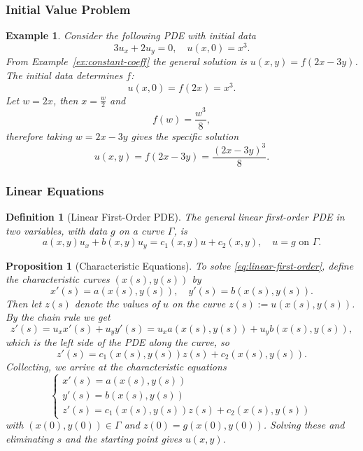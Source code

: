 \documentclass{article}
\newtheorem{definition}{Definition}
\newtheorem*{example}{Example}
\newtheorem{proposition}{Proposition}
\begin{document}
\subsubsection{Initial Value Problem}
\begin{example}
    Consider the following PDE with initial data
    \[3u_x+2u_y = 0, \quad u(x,0) = x^3.\]
    From Example~\ref{ex:constant-coeff} the general solution is $u(x,y) = f(2x-3y)$. The initial data determines $f$:
    \[u(x,0) = f(2x) = x^3.\]
    Let $w = 2x$, then $x=\frac{w}{2}$ and
    \[f(w) = \frac{w^3}{8},\]
    therefore taking $w=2x-3y$ gives the specific solution
    \[u(x,y) = f(2x-3y) = \frac{(2x-3y)^3}{8}.\]
\end{example}

\subsubsection{Linear Equations}
\begin{definition}[Linear First-Order PDE]
    The general linear first-order PDE in two variables, with data $g$ on a curve $\Gamma$, is
    \begin{equation}
        \label{eq:linear-first-order}
        a(x,y)u_x+b(x,y)u_y = c_1(x,y)u + c_2(x,y),\quad u = g \text{ on } \Gamma.
    \end{equation}
\end{definition}
\begin{proposition}[Characteristic Equations]
    \label{prop:characteristic-eqs}
    To solve \eqref{eq:linear-first-order}, define the characteristic curves $(x(s),y(s))$ by
    \[x'(s) = a(x(s),y(s)),\quad y'(s) = b(x(s),y(s)).\]
    Then let $z(s)$ denote the values of $u$ on the curve $z(s) := u(x(s),y(s))$. By the chain rule we get
    \[z'(s) = u_xx'(s) + u_yy'(s) = u_xa(x(s),y(s))+u_yb(x(s),y(s)),\]
    which is the left side of the PDE along the curve, so
    \[z'(s) = c_1(x(s),y(s))z(s)+c_2(x(s),y(s)).\]
    Collecting, we arrive at the characteristic equations
    \[\begin{cases}x'(s)=a(x(s),y(s))\\y'(s)=b(x(s),y(s))\\z'(s)=c_1(x(s),y(s))z(s)+c_2(x(s),y(s))\end{cases}\]
    with $(x(0),y(0))\in\Gamma$ and $z(0)=g(x(0),y(0))$. Solving these and eliminating $s$ and the starting point gives $u(x,y)$.
\end{proposition}
\end{document}
